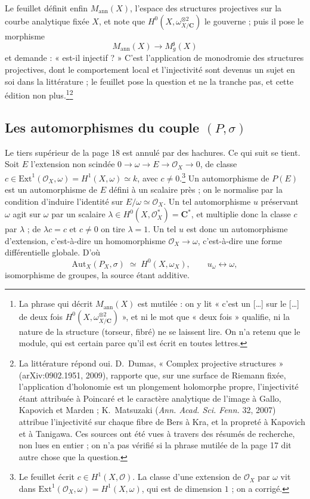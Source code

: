 \documentclass[11pt,a4paper]{article}
\begin{document}
Le feuillet définit enfin $M_{\mathrm{ann}}(X)$, l'espace des structures
projectives sur la courbe analytique fixée $X$, et note que
$H^0(X, \omega^{\otimes 2}_{X/\mathbf{C}})$ le gouverne ; puis il pose le
morphisme
\[
  M_{\mathrm{ann}}(X) \longrightarrow M_g^{\mathfrak{z}}(X)
\]
et demande : « est-il injectif ? » C'est l'application de monodromie des
structures projectives, dont le comportement local et l'injectivité sont
devenus un sujet en soi dans la littérature ; le feuillet pose la question et
ne la tranche pas, et cette édition non plus.\footnote{La phrase qui décrit
$M_{\mathrm{ann}}(X)$ est mutilée : on y lit « c'est un [\ldots] sur le
[\ldots] de deux fois $H^0(X,\omega^{\otimes 2}_{X/\mathbf{C}})$ », et ni le
mot que « deux fois » qualifie, ni la nature de la structure (torseur,
fibré) ne se laissent lire. On n'a retenu que le module, qui est certain
parce qu'il est écrit en toutes lettres.}\footnote{La littérature répond oui. D.~Dumas, « Complex projective
structures » (arXiv:0902.1951, 2009), rapporte que, sur une surface de Riemann
fixée, l'application d'holonomie est un plongement holomorphe propre,
l'injectivité étant attribuée à Poincaré et le caractère analytique de l'image
à Gallo, Kapovich et Marden ; K.~Matsuzaki (\emph{Ann. Acad. Sci. Fenn.} 32,
2007) attribue l'injectivité sur chaque fibre de Bers à Kra, et la propreté à
Kapovich et à Tanigawa. Ces sources ont été vues à travers des résumés de
recherche, non lues en entier ; on n'a pas vérifié si la phrase mutilée de la
page 17 dit autre chose que la question.}

\subsection*{Les automorphismes du couple $(P,\sigma)$}

Le tiers supérieur de la page 18 est annulé par des hachures. Ce qui suit se
tient. Soit $E$ l'extension non scindée $0 \to \omega \to E \to \mathcal{O}_X
\to 0$, de classe $c \in \mathrm{Ext}^1(\mathcal{O}_X, \omega) =
H^1(X, \omega) \simeq k$, avec $c \neq 0$.\footnote{Le feuillet écrit
$c \in H^1(X, \mathcal{O})$. La classe d'une extension de $\mathcal{O}_X$
par $\omega$ vit dans $\mathrm{Ext}^1(\mathcal{O}_X, \omega) = H^1(X,
\omega)$, qui est de dimension $1$ ; on a corrigé.} Un automorphisme de
$P(E)$ est un automorphisme de $E$ défini à un scalaire près ; on le
normalise par la condition d'induire l'identité sur $E/\omega \simeq
\mathcal{O}_X$. Un tel automorphisme $u$ préservant $\omega$ agit sur
$\omega$ par un scalaire $\lambda \in H^0(X, \mathcal{O}_X^*) =
\mathbf{C}^*$, et multiplie donc la classe $c$ par $\lambda$ ; de $\lambda c = c$ et $c \neq 0$ on tire $\lambda = 1$. Un tel $u$
est donc un automorphisme d'extension, c'est-à-dire un homomorphisme
$\mathcal{O}_X \to \omega$, c'est-à-dire une forme différentielle globale.
D'où
\[
  \mathrm{Aut}_X(P_X, \sigma) \;\simeq\; H^0(X, \omega_X),
  \qquad u_\omega \longleftrightarrow \omega,
\]
isomorphisme de groupes, la source étant additive.
\end{document}
